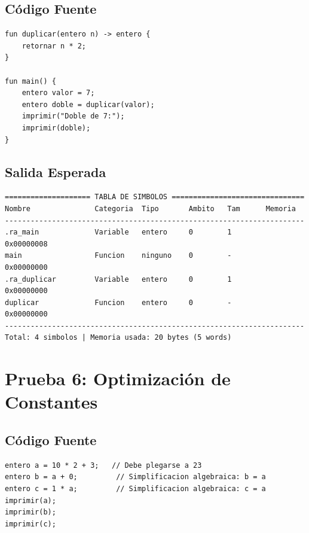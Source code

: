 \subsection{Código Fuente}

\begin{lstlisting}[style=tppstyle, caption={Programa correcto con declaración y llamada de función}]
fun duplicar(entero n) -> entero {
    retornar n * 2;
}

fun main() {
    entero valor = 7;
    entero doble = duplicar(valor);
    imprimir("Doble de 7:");
    imprimir(doble);
}
\end{lstlisting}

\subsection{Salida Esperada}

\begin{verbatim}
==================== TABLA DE SIMBOLOS ===============================
Nombre               Categoria  Tipo       Ambito   Tam      Memoria   
----------------------------------------------------------------------
.ra_main             Variable   entero     0        1        0x00000008
main                 Funcion    ninguno    0        -        0x00000000
.ra_duplicar         Variable   entero     0        1        0x00000000
duplicar             Funcion    entero     0        -        0x00000000
----------------------------------------------------------------------
Total: 4 simbolos | Memoria usada: 20 bytes (5 words)
\end{verbatim}


\section{Prueba 6: Optimización de Constantes}

\subsection{Código Fuente}

\begin{lstlisting}[style=tppstyle, caption={Programa que activa plegado de constantes y simplificación algebraica}]
entero a = 10 * 2 + 3;   // Debe plegarse a 23
entero b = a + 0;         // Simplificacion algebraica: b = a
entero c = 1 * a;         // Simplificacion algebraica: c = a
imprimir(a);
imprimir(b);
imprimir(c);
\end{lstlisting}

